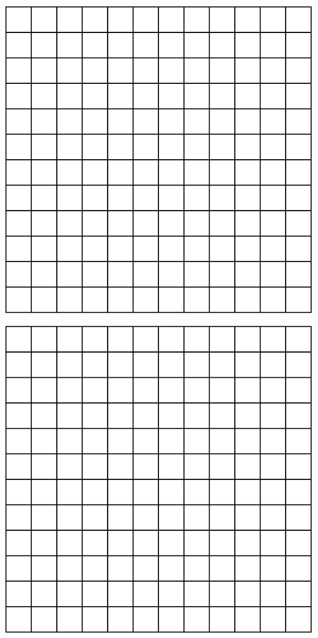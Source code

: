 \documentclass{article}
\begin{document}
\begin{flushleft}
\begin{minipage}{3in}
\end{minipage}
\vspace{0.1in}\\
\begin{minipage}{3in}
\includegraphics[scale=0.75]{grid_12_by_12.eps}
\end{minipage}
\begin{minipage}{3in}
\includegraphics[scale=0.75]{grid_12_by_12.eps}
\end{minipage}


\end{flushleft}
\end{document}
